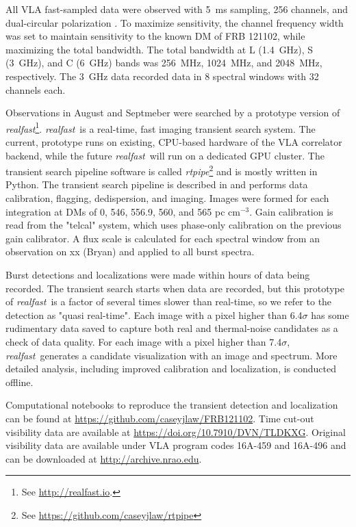 \documentclass[twocolumn]{aastex61}
\newcommand{\rf}{\emph{realfast}}
\newcommand{\frb}{FRB 121102}
\begin{document}
All VLA fast-sampled data were observed with 5~ms sampling, 256 channels, and dual-circular polarization \citep[as in]{2015ApJ...807...16L}. To maximize sensitivity, the channel frequency width was set to maintain sensitivity to the known DM of \frb, while maximizing the total bandwidth. The total bandwidth at L (1.4~GHz), S (3~GHz), and C (6~GHz) bands was 256~MHz, 1024~MHz, and 2048~MHz, respectively. The 3~GHz data recorded data in 8 spectral windows with 32 channels each.

Observations in August and Septmeber were searched by a prototype version of \rf\footnote{See \url{http://realfast.io}.}. \rf\ is a real-time, fast imaging transient search system. The current, prototype runs on existing, CPU-based hardware of the VLA correlator backend, while the future \rf\ will run on a dedicated GPU cluster. The transient search pipeline software is called \emph{rtpipe}\footnote{See \url{https://github.com/caseyjlaw/rtpipe}} and is mostly written in Python. The transient search pipeline is described in \citet{2015ApJ...807...16L} and performs data calibration, flagging, dedispersion, and imaging. Images were formed for each integration at DMs of 0, 546, 556.9, 560, and 565 pc cm$^{-3}$. Gain calibration is read from the "telcal" system, which uses phase-only calibration on the previous gain calibrator. A flux scale is calculated for each spectral window from an observation on {\color{red} xx (Bryan)} and applied to all burst spectra.

Burst detections and localizations were made within hours of data being recorded. The transient search starts when data are recorded, but this prototype of \rf\ is a factor of several times slower than real-time, so we refer to the detection as "quasi real-time". Each image with a pixel higher than 6.4$\sigma$ has some rudimentary data saved to capture both real and thermal-noise candidates as a check of data quality. For each image with a pixel higher than 7.4$\sigma$, \rf\ generates a candidate visualization with an image and spectrum. More detailed analysis, including improved calibration and localization, is conducted offline. 

Computational notebooks to reproduce the transient detection and localization can be found at \url{https://github.com/caseyjlaw/FRB121102}. Time cut-out visibility data are available at \url{https://doi.org/10.7910/DVN/TLDKXG}. Original visibility data are available under VLA program codes 16A-459 and 16A-496 and can be downloaded at \url{http://archive.nrao.edu}.
\end{document}
